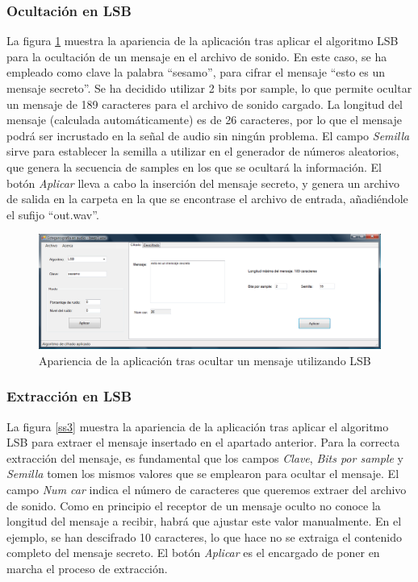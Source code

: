 \documentclass[12pt]{article}
\begin{document}
\subsubsection{Ocultación en LSB}

La figura \ref{ss2} muestra la apariencia de la aplicación tras aplicar el algoritmo LSB para la ocultación de un mensaje en el archivo de sonido. En este caso, se ha empleado como clave la palabra ``sesamo'', para cifrar el mensaje  ``esto es un mensaje secreto''. Se ha decidido utilizar 2 bits por sample, lo que permite ocultar un mensaje de 189 caracteres para el archivo de sonido cargado. La longitud del mensaje (calculada automáticamente) es de 26 caracteres, por lo que el mensaje podrá ser incrustado en la señal de audio sin ningún problema. El campo \emph{Semilla} sirve para establecer la semilla a utilizar en el generador de números aleatorios, que genera la secuencia de samples en los que se ocultará la información. El botón \emph{Aplicar} lleva a cabo la inserción del mensaje secreto, y genera un archivo de salida en la carpeta en la que se encontrase el archivo de entrada, añadiéndole el sufijo ``out.wav''.

\begin{figure}[h]
  \centering
    \includegraphics[width=\textwidth]{img/ss2}
  \caption{Apariencia de la aplicación tras ocultar un mensaje utilizando LSB}
  \label{ss2}
\end{figure}

\subsubsection{Extracción en LSB}

La figura \ref{ss3} muestra la apariencia de la aplicación tras aplicar el algoritmo LSB para extraer el mensaje insertado en el apartado anterior. Para la correcta extracción del mensaje, es fundamental que los campos \emph{Clave}, \emph{Bits por sample} y \emph{Semilla} tomen los mismos valores que se emplearon para ocultar el mensaje. El campo \emph{Num car} indica el número de caracteres que queremos extraer del archivo de sonido. Como en principio el receptor de un mensaje oculto no conoce la longitud del mensaje a recibir, habrá que ajustar este valor manualmente. En el ejemplo, se han descifrado 10 caracteres, lo que hace no se extraiga el contenido completo del mensaje secreto. El botón \emph{Aplicar} es el encargado de poner en marcha el proceso de extracción.
\end{document}
